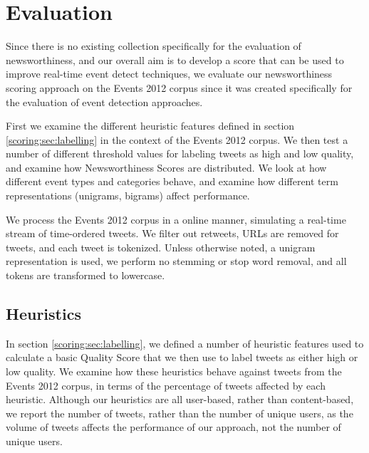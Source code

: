 
\section{Evaluation}
\label{scoring:sec:eval}

Since there is no existing collection specifically for the evaluation of newsworthiness, and our overall aim is to develop a score that can be used to improve real-time event detect techniques, we evaluate our newsworthiness scoring approach on the Events 2012 corpus since it was created specifically for the evaluation of event detection approaches.

First we examine the different heuristic features defined in section \ref{scoring:sec:labelling} in the context of the Events 2012 corpus.
We then test a number of different threshold values for labeling tweets as high and low quality, and examine how Newsworthiness Scores are distributed.
We look at how different event types and categories behave, and examine how different term representations (unigrams, bigrams)  affect performance.

We process the Events 2012 corpus in a online manner, simulating a real-time stream of time-ordered tweets.
We filter out retweets, URLs are removed for tweets, and each tweet is tokenized. Unless otherwise noted, a unigram representation is used, we perform no stemming or stop word removal, and all tokens are transformed to lowercase.

\subsection{Heuristics}
In section \ref{scoring:sec:labelling}, we defined a number of heuristic features used to calculate a basic Quality Score that we then use to label tweets as either high or low quality.
We examine how these heuristics behave against tweets from the Events 2012 corpus, in terms of the percentage of tweets affected by each heuristic.
Although our heuristics are all user-based, rather than content-based, we report the number of tweets, rather than the number of unique users, as the volume of tweets affects the performance of our approach, not the number of unique users.

